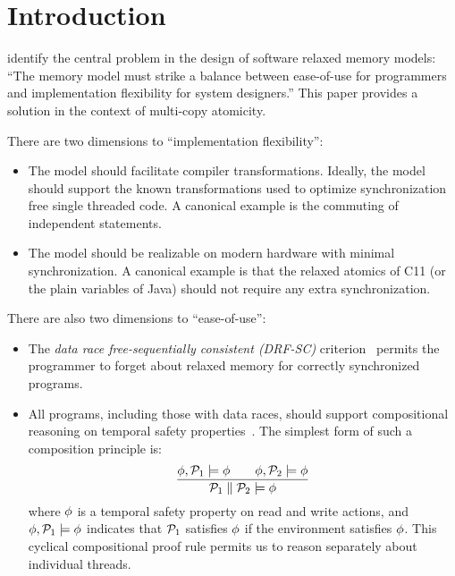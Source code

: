
\section{Introduction}
\citet{Manson:2005:JMM:1047659.1040336} identify the central problem in the design of software relaxed memory models: ``The memory model must strike a balance between ease-of-use for programmers and implementation flexibility for system designers.''   This paper provides a solution  in the context of multi-copy atomicity.


There are two dimensions to ``implementation flexibility'':
\begin{itemize}
\item The  model should facilitate compiler transformations.    Ideally, the model should support the known transformations used to optimize  synchronization free single threaded code.  A canonical example is the  commuting of independent statements.

\item The model should be realizable on modern hardware with minimal synchronization.  A canonical example is that the relaxed atomics of C11 (or the plain variables of Java) should not require any extra synchronization.
\end{itemize}

There are also two dimensions to ``ease-of-use'':
\begin{itemize}
\item The \emph{data race free-sequentially consistent (DRF-SC)} criterion~\cite{DBLP:journals/tpds/AdveH93, DBLP:conf/isca/AdveH90} permits the programmer to forget about relaxed memory for correctly synchronized programs.  

\item All programs, including those with data races,  should support compositional reasoning on temporal safety properties~\cite{PnueliSafety,Misra:1981:PNP:1313338.1313770,StarkSafety,Abadi:1993:CS:151646.151649}.  The simplest form of such a composition principle is:
\[
  \frac{
      \phi, \mathcal{P}_1 \models\phi
      \qquad
      \phi, \mathcal{P}_2 \models\phi
    }{\mathcal{P}_1 \parallel \mathcal{P}_2 \models \phi}
\]
where $\phi$ is a temporal safety property on read and write actions, and $\phi, \mathcal{P}_1 \models\phi$ indicates that $\mathcal{P}_1$ satisfies $\phi$ if the environment satisfies $\phi$.  This cyclical compositional proof rule permits us to reason separately about individual threads. 
\end{itemize}

